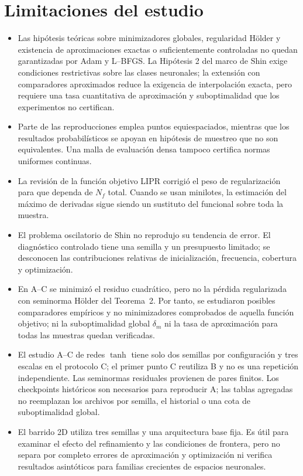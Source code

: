 \section{Limitaciones del estudio}

\begin{itemize}
\item Las hipótesis teóricas sobre minimizadores globales, regularidad H\"older y existencia de aproximaciones exactas o suficientemente controladas no quedan garantizadas por Adam y L--BFGS. La Hipótesis 2 del marco de Shin exige condiciones restrictivas sobre las clases neuronales; la extensión con comparadores aproximados reduce la exigencia de interpolación exacta, pero requiere una tasa cuantitativa de aproximación y suboptimalidad que los experimentos no certifican.
\item Parte de las reproducciones emplea puntos equiespaciados, mientras que los resultados probabilísticos se apoyan en hipótesis de muestreo que no son equivalentes. Una malla de evaluación densa tampoco certifica normas uniformes continuas.
\item La revisión de la función objetivo LIPR corrigió el peso de regularización para que dependa de $N_f$ total. Cuando se usan minilotes, la estimación del máximo de derivadas sigue siendo un sustituto del funcional sobre toda la muestra.
\item El problema oscilatorio de Shin no reprodujo su tendencia de error. El diagnóstico controlado tiene una semilla y un presupuesto limitado; se desconocen las contribuciones relativas de inicialización, frecuencia, cobertura y optimización.
\item En A--C se minimizó el residuo cuadrático, pero no la pérdida
regularizada con seminorma H\"older del Teorema~2. Por tanto, se
estudiaron posibles comparadores empíricos y no minimizadores
comprobados de aquella función objetivo; ni la suboptimalidad global
$\delta_m$ ni la tasa de aproximación para todas las muestras quedan
verificadas.
\item El estudio A--C de redes $\tanh$ tiene solo dos semillas por
configuración y tres escalas en el protocolo C; el primer punto C
reutiliza B y no es una repetición independiente. Las seminormas
residuales provienen de pares finitos. Los checkpoints históricos son
necesarios para reproducir A; las tablas agregadas no reemplazan los
archivos por semilla, el historial o una cota de suboptimalidad global.
\item El barrido 2D utiliza tres semillas y una arquitectura base fija. Es útil para examinar el efecto del refinamiento y las condiciones de frontera, pero no separa por completo errores de aproximación y optimización ni verifica resultados asintóticos para familias crecientes de espacios neuronales.

\end{itemize}
